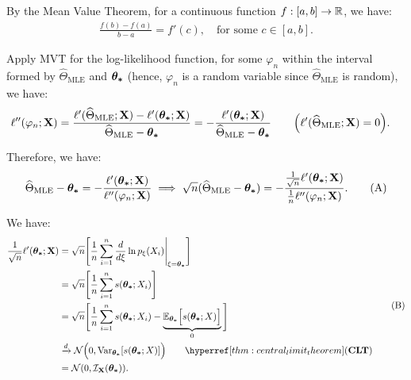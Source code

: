 \begin{proof*}
    By the Mean Value Theorem, for a continuous function $f:[a, b] \to \mathbb{R}$, we have:
    \begin{align*}
        \frac{f(b) - f(a)}{b - a} = f'(c), \quad \text{for some } c\in [a,b]. 
    \end{align*} 

    \noindent Apply MVT for the log-likelihood function, for some $\varphi_n$ within the interval formed by $\widehat{\Theta}_\mathrm{MLE}$ and $\boldsymbol{\theta_*}$ (hence, $\varphi_n$ is a random variable since $\widehat{\Theta}_\mathrm{MLE}$ is random), we have:
    \begin{align*}
         \ell''(\varphi_n;{\bf X}) &= \frac{\ell'(\widehat{\Theta}_\mathrm{MLE};{\bf X}) - \ell'(\boldsymbol{\theta_*};{\bf X})}{\widehat{\Theta}_\mathrm{MLE} - \boldsymbol{\theta_*}} = -\frac{\ell'(\boldsymbol{\theta_*};{\bf X})}{\widehat{\Theta}_\mathrm{MLE} - \boldsymbol{\theta_*}} \qquad \Big( \ell'(\widehat{\Theta}_\mathrm{MLE};{\bf X}) = 0 \Big).
    \end{align*} 

    \noindent Therefore, we have:
    \begin{equation}
        \label{eq:asympt_normality_mle_mvt}
        \widehat{\Theta}_\mathrm{MLE} - \boldsymbol{\theta_*} = -\frac{\ell'(\boldsymbol{\theta_*};{\bf X})}{\ell''(\varphi_n;{\bf X})}\implies \sqrt{n}(\widehat{\Theta}_\mathrm{MLE} - \boldsymbol{\theta_*}) = -\frac{\frac{1}{\sqrt n} \ell'(\boldsymbol{\theta_*};{\bf X})}{\frac{1}{n}\ell''(\varphi_n;{\bf X})}.\tag{A}
    \end{equation} 

    \noindent We have:
    \begin{equation}
    \label{eq:asympt_normality_mle_numerator}
    \begin{aligned}
        \frac{1}{\sqrt n}\ell'(\btheta;\bX) &= \sqrt{n}\biggSquare{\frac{1}{n}\sum_{i=1}^n \frac{d}{d\xi}\ln p_{\xi}(X_i)\Bigg|_{\xi=\btheta}} \\
        &= \sqrt{n} \biggSquare{
            \frac{1}{n}\sum_{i=1}^n s(\btheta;X_i)
        } \\
        &= \sqrt{n} \biggSquare{
            \frac{1}{n}\sum_{i=1}^n s(\btheta;X_i) - \underbrace{\E_{\btheta}\bigSquare{s(\btheta;X)}}_{0}
        } \\
        &\xrightarrow{d} \mathcal{N}\bigRound{0, \mathrm{Var}_{\btheta}[s(\btheta; X)]} \qquad\CLT \\
        &= \mathcal{N}(0, \mathcal{I}_{\bX}(\btheta)).
    \end{aligned}
    \tag{B}
    \end{equation} 


\end{proof*}
